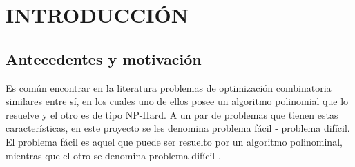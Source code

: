 
\chapter{INTRODUCCIÓN}
\label{cap:intro}




\section{Antecedentes y motivación}
\label{intro:motivacion}

Es común encontrar en la literatura problemas de optimización combinatoria similares entre sí, en los cuales uno de ellos posee un algoritmo polinomial que lo resuelve \citep{papadimitriou1982combinatorial} y el otro es de tipo NP-Hard. 
A un par de problemas que tienen estas características, en este proyecto se les denomina problema fácil - problema difícil. El problema fácil es aquel que puede ser resuelto por un algoritmo polinominal, mientras que el otro se denomina problema difícil \citep{cook1995combinatorial}. 

